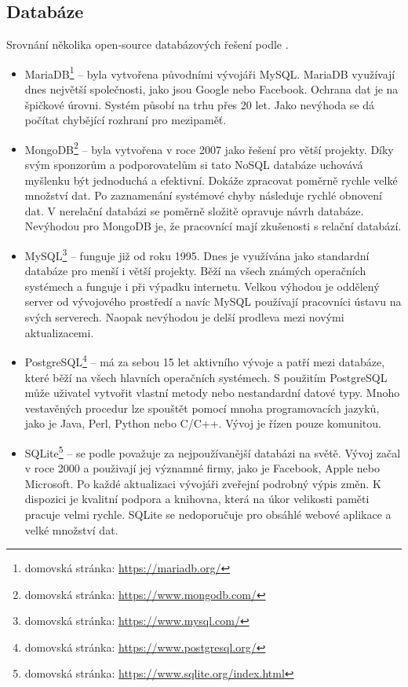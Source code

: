         \subsection{Databáze}
            Srovnání několika open-source databázových řešení podle \cite{database}.
            \begin{itemize}
                
                \item MariaDB\footnote{domovská stránka: \url{https://mariadb.org/}} – byla vytvořena původními vývojáři MySQL. MariaDB využívají dnes největší společnosti, jako jsou Google nebo Facebook. Ochrana dat je na špičkové úrovni. Systém působí na trhu přes 20 let. Jako nevýhoda se dá počítat chybějící rozhraní pro mezipaměť.
                
                \item MongoDB\footnote{domovská stránka: \url{https://www.mongodb.com/}} – byla vytvořena v roce 2007 jako řešení pro větší projekty. Díky svým sponzorům a podporovatelům si tato NoSQL databáze uchovává myšlenku být jednoduchá a efektivní. Dokáže zpracovat poměrně rychle velké množství dat. Po zaznamenání systémové chyby následuje rychlé obnovení dat. V nerelační databázi se poměrně složitě opravuje návrh databáze. Nevýhodou pro MongoDB je, že pracovnící mají zkušenosti s relační databází.
                
                \item MySQL\footnote{domovská stránka: \url{https://www.mysql.com/}} – funguje již od roku 1995. Dnes je využívána jako standardní databáze pro menší i větší projekty. Běží na všech známých operačních systémech a funguje i při výpadku internetu. Velkou výhodou je oddělený server od vývojového prostředí a navíc MySQL používají pracovníci ústavu na svých serverech. Naopak nevýhodou je delší prodleva mezi novými aktualizacemi.
                
                \item PostgreSQL\footnote{domovská stránka: \url{https://www.postgresql.org/}} – má za sebou 15 let aktivního vývoje a patří mezi databáze, které běží na všech hlavních operačních systémech. S použitím PostgreSQL může uživatel vytvořit vlastní metody nebo nestandardní datové typy. Mnoho vestavěných procedur lze spouštět pomocí mnoha programovacích jazyků, jako je Java, Perl, Python nebo C/C++. Vývoj je řízen pouze komunitou.
                
                \item SQLite\footnote{domovská stránka: \url{https://www.sqlite.org/index.html}} – se podle \cite{database} považuje za nejpoužívanější databázi na světě. Vývoj začal v roce 2000 a použivají jej významné firmy, jako je Facebook, Apple nebo Microsoft. Po každé aktualizaci vývojáři zveřejní podrobný výpis změn. K dispozici je kvalitní podpora a knihovna, která na úkor velikosti paměti pracuje velmi rychle. SQLite se nedoporučuje pro obsáhlé webové aplikace a velké množství dat. 
                
        \end{itemize}
        
